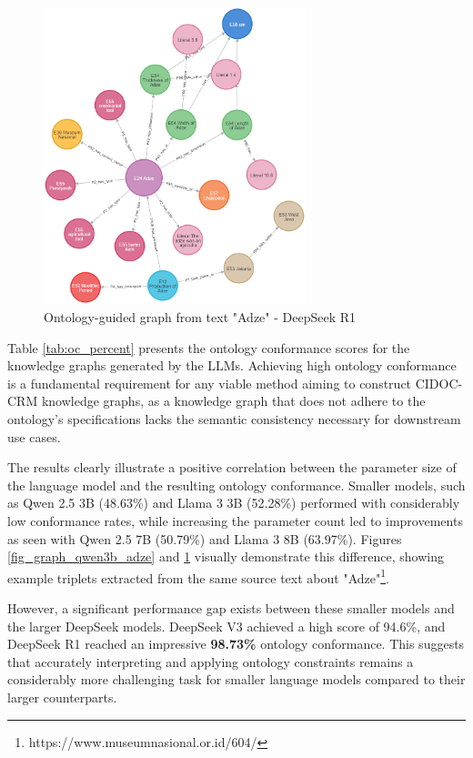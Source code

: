 \documentclass[a4, conference]{IEEEtran}
\begin{document}
\begin{figure}[!t]
    \centering
    \includegraphics[width=3in]{assets/graph-r1-adze}
    \caption{Ontology-guided graph from text "Adze" - DeepSeek R1}
    \label{fig_graph_r1_adze}
\end{figure}

Table \ref{tab:oc_percent} presents the ontology conformance scores for the knowledge graphs generated by the LLMs. Achieving high ontology conformance is a fundamental requirement for any viable method aiming to construct CIDOC-CRM knowledge graphs, as a knowledge graph that does not adhere to the ontology's specifications lacks the semantic consistency necessary for downstream use cases.

The results clearly illustrate a positive correlation between the parameter size of the language model and the resulting ontology conformance. Smaller models, such as Qwen 2.5 3B (48.63\%) and Llama 3 3B (52.28\%) performed with considerably low conformance rates, while increasing the parameter count led to improvements as seen with Qwen 2.5 7B (50.79\%) and Llama 3 8B (63.97\%). Figures \ref{fig_graph_qwen3b_adze} and \ref{fig_graph_r1_adze} visually demonstrate this difference, showing example triplets extracted from the same source text about "Adze"\footnote{https://www.museumnasional.or.id/604/}.

However, a significant performance gap exists between these smaller models and the larger DeepSeek models. DeepSeek V3 achieved a high score of 94.6\%, and DeepSeek R1 reached an impressive \textbf{98.73\%} ontology conformance. This suggests that accurately interpreting and applying ontology constraints remains a considerably more challenging task for smaller language models compared to their larger counterparts.
\end{document}
